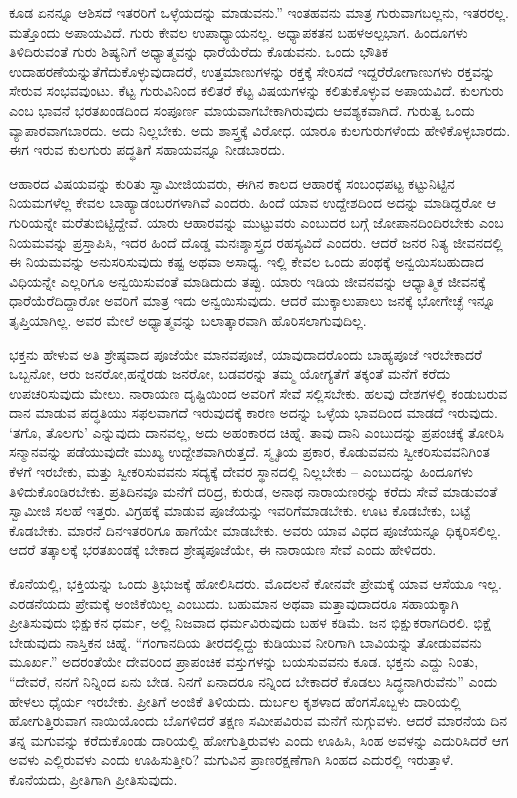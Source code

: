 ಕೂಡ ಏನನ್ನೂ ಆಶಿಸದೆ ಇತರರಿಗೆ ಒಳ್ಳೆಯದನ್ನು ಮಾಡುವನು.” ಇಂತಹವನು ಮಾತ್ರ ಗುರುವಾಗಬಲ್ಲನು, ಇತರರಲ್ಲ. ಮತ್ತೊಂದು ಅಪಾಯವಿದೆ. ಗುರು ಕೇವಲ ಉಪಾಧ್ಯಾಯನಲ್ಲ. ಅಧ್ಯಾಪಕತನ ಬಹಳ\break ಅಲ್ಪಭಾಗ. ಹಿಂದೂಗಳು ತಿಳಿದಿರುವಂತೆ ಗುರು ಶಿಷ್ಯನಿಗೆ ಅಧ್ಯಾತ್ಮ\break ವನ್ನು ಧಾರೆಯೆರೆದು ಕೊಡುವನು. ಒಂದು ಭೌತಿಕ ಉದಾಹರಣೆಯನ್ನು\break ತೆಗೆದುಕೊಳ್ಳುವುದಾದರೆ, ಉತ್ತಮಾಣುಗಳನ್ನು ರಕ್ತಕ್ಕೆ ಸೇರಿಸದೆ ಇದ್ದರೆ\break ರೋಗಾಣುಗಳು ರಕ್ತವನ್ನು ಸೇರುವ ಸಂಭವವುಂಟು. ಕೆಟ್ಟ ಗುರುವಿನಿಂದ ಕಲಿತರೆ ಕೆಟ್ಟ ವಿಷಯಗಳನ್ನು ಕಲಿತುಕೊಳ್ಳುವ ಅಪಾಯವಿದೆ. ಕುಲಗುರು ಎಂಬ ಭಾವನೆ ಭರತಖಂಡದಿಂದ ಸಂಪೂರ್ಣ ಮಾಯವಾಗಬೇಕಾಗಿರುವುದು ಆವಶ್ಯಕವಾಗಿದೆ. ಗುರುತ್ವ ಒಂದು ವ್ಯಾಪಾರವಾಗಬಾರದು. ಅದು ನಿಲ್ಲಬೇಕು. ಅದು ಶಾಸ್ತ್ರಕ್ಕೆ ವಿರೋಧ. ಯಾರೂ ಕುಲಗುರುಗಳೆಂದು ಹೇಳಿಕೊಳ್ಳಬಾರದು. ಈಗ ಇರುವ ಕುಲಗುರು ಪದ್ಧತಿಗೆ ಸಹಾಯವನ್ನೂ ನೀಡಬಾರದು.

ಆಹಾರದ ವಿಷಯವನ್ನು ಕುರಿತು ಸ್ವಾಮೀಜಿಯವರು, ಈಗಿನ ಕಾಲದ ಆಹಾರಕ್ಕೆ ಸಂಬಂಧಪಟ್ಟ ಕಟ್ಟುನಿಟ್ಟಿನ ನಿಯಮಗಳೆಲ್ಲ ಕೇವಲ ಬಾಹ್ಯಾಡಂಬರಗಳಾಗಿವೆ ಎಂದರು. ಹಿಂದೆ ಯಾವ ಉದ್ದೇಶದಿಂದ ಅದನ್ನು ಮಾಡಿದ್ದರೋ ಆ ಗುರಿಯನ್ನೇ ಮರೆತುಬಿಟ್ಟಿದ್ದೇವೆ. ಯಾರು ಆಹಾರವನ್ನು ಮುಟ್ಟುವರು ಎಂಬುದರ ಬಗ್ಗೆ ಜೋಪಾನದಿಂದಿರಬೇಕು ಎಂಬ ನಿಯಮವನ್ನು ಪ್ರಸ್ತಾಪಿಸಿ, ಇದರ ಹಿಂದೆ ದೊಡ್ಡ ಮನಃಶ್ಶಾಸ್ತ್ರದ ರಹಸ್ಯವಿದೆ ಎಂದರು. ಆದರೆ ಜನರ ನಿತ್ಯ ಜೀವನದಲ್ಲಿ ಈ ನಿಯಮವನ್ನು ಅನುಸರಿಸುವುದು ಕಷ್ಟ ಅಥವಾ ಅಸಾಧ್ಯ. ಇಲ್ಲಿ ಕೇವಲ ಒಂದು ಪಂಥಕ್ಕೆ ಅನ್ವಯಿಸಬಹುದಾದ ವಿಧಿಯನ್ನೇ ಎಲ್ಲರಿಗೂ ಅನ್ವಯಿಸುವಂತೆ ಮಾಡಿದುದು ತಪ್ಪು. ಯಾರು ಇಡಿಯ ಜೀವನವನ್ನು ಆಧ್ಯಾತ್ಮಿಕ ಜೀವನಕ್ಕೆ ಧಾರೆಯೆರೆದಿದ್ದಾರೋ ಅವರಿಗೆ ಮಾತ್ರ ಇದು ಅನ್ವಯಿಸುವುದು. ಆದರೆ ಮುಕ್ಕಾಲುಪಾಲು ಜನಕ್ಕೆ ಭೋಗೇಚ್ಛೆ ಇನ್ನೂ ತೃಪ್ತಿಯಾಗಿಲ್ಲ. ಅವರ ಮೇಲೆ ಅಧ್ಯಾತ್ಮವನ್ನು ಬಲಾತ್ಕಾರವಾಗಿ ಹೊರಿಸಲಾಗುವುದಿಲ್ಲ.

ಭಕ್ತನು ಹೇಳುವ ಅತಿ ಶ್ರೇಷ್ಠವಾದ ಪೂಜೆಯೇ ಮಾನವಪೂಜೆ, ಯಾವು\-ದಾದರೊಂದು ಬಾಹ್ಯಪೂಜೆ ಇರಬೇಕಾದರೆ ಒಬ್ಬನೋ, ಆರು ಜನರೋ,\break ಹನ್ನೆರಡು ಜನರೋ, ಬಡವರನ್ನು ತಮ್ಮ ಯೋಗ್ಯತೆಗೆ ತಕ್ಕಂತೆ ಮನೆಗೆ ಕರೆದು ಉಪಚರಿಸುವುದು ಮೇಲು. ನಾರಾಯಣ ದೃಷ್ಟಿಯಿಂದ ಅವರಿಗೆ ಸೇವೆ ಸಲ್ಲಿಸಬೇಕು. ಹಲವು ದೇಶಗಳಲ್ಲಿ ಕಂಡುಬರುವ ದಾನ ಮಾಡುವ ಪದ್ಧತಿಯು ಸಫಲವಾಗದೆ ಇರುವುದಕ್ಕೆ ಕಾರಣ ಅದನ್ನು ಒಳ್ಳೆಯ ಭಾವದಿಂದ ಮಾಡದೆ ಇರುವುದು. ‘ತಗೊ, ತೊಲಗು’ ಎನ್ನುವುದು ದಾನವಲ್ಲ, ಅದು ಅಹಂಕಾರದ ಚಿಹ್ನೆ. ತಾವು ದಾನಿ ಎಂಬುದನ್ನು ಪ್ರಪಂಚಕ್ಕೆ ತೋರಿಸಿ ಸನ್ಮಾನವನ್ನು ಪಡೆಯುವುದೇ ಮುಖ್ಯ ಉದ್ದೇಶವಾಗಿರುತ್ತದೆ. ಸ್ಮೃತಿಯ ಪ್ರಕಾರ, ಕೊಡುವವನು ಸ್ವೀಕರಿಸುವವನಿಗಿಂತ ಕೆಳಗೆ ಇರಬೇಕು, ಮತ್ತು ಸ್ವೀಕರಿಸುವವನು ಸದ್ಯಕ್ಕೆ ದೇವರ ಸ್ಥಾನದಲ್ಲಿ ನಿಲ್ಲಬೇಕು – ಎಂಬುದನ್ನು ಹಿಂದೂಗಳು ತಿಳಿದುಕೊಂಡಿರಬೇಕು. ಪ್ರತಿದಿನವೂ ಮನೆಗೆ ದರಿದ್ರ, ಕುರುಡ, ಅನಾಥ ನಾರಾಯಣರನ್ನು ಕರೆದು ಸೇವೆ ಮಾಡುವಂತೆ ಸ್ವಾಮೀಜಿ ಸಲಹೆ ಇತ್ತರು. ವಿಗ್ರಹಕ್ಕೆ ಮಾಡುವ ಪೂಜೆಯನ್ನು ಇವರಿಗೆ\break ಮಾಡಬೇಕು. ಊಟ ಕೊಡಬೇಕು, ಬಟ್ಟೆ ಕೊಡಬೇಕು. ಮಾರನೆ ದಿನ\break ಇತರರಿಗೂ ಹಾಗೆಯೇ ಮಾಡಬೇಕು. ಅವರು ಯಾವ ವಿಧದ ಪೂಜೆಯನ್ನೂ ಧಿಕ್ಕರಿಸಲಿಲ್ಲ. ಆದರೆ ತತ್ಕಾಲಕ್ಕೆ ಭರತಖಂಡಕ್ಕೆ ಬೇಕಾದ ಶ್ರೇಷ್ಠಪೂಜೆಯೇ, ಈ ನಾರಾಯಣ ಸೇವೆ ಎಂದು ಹೇಳಿದರು.

ಕೊನೆಯಲ್ಲಿ, ಭಕ್ತಿಯನ್ನು ಒಂದು ತ್ರಿಭುಜಕ್ಕೆ ಹೋಲಿಸಿದರು. ಮೊದಲನೆ ಕೋನವೇ ಪ್ರೇಮಕ್ಕೆ ಯಾವ ಆಸೆಯೂ ಇಲ್ಲ. ಎರಡನೆಯದು ಪ್ರೇಮಕ್ಕೆ ಅಂಜಿಕೆಯಿಲ್ಲ ಎಂಬುದು. ಬಹುಮಾನ ಅಥವಾ ಮತ್ತಾವುದಾದರೂ ಸಹಾಯಕ್ಕಾಗಿ ಪ್ರೀತಿಸುವುದು ಭಿಕ್ಷುಕನ ಧರ್ಮ, ಅಲ್ಲಿ ನಿಜವಾದ ಧರ್ಮವಿರುವುದು ಬಹಳ ಕಡಿಮೆ. ಜನ ಭಿಕ್ಷುಕರಾಗದಿರಲಿ. ಭಿಕ್ಷೆ ಬೇಡುವುದು ನಾಸ್ತಿಕನ ಚಿಹ್ನೆ. “ಗಂಗಾನದಿಯ ತೀರದಲ್ಲಿದ್ದು ಕುಡಿಯುವ ನೀರಿಗಾಗಿ ಬಾವಿಯನ್ನು ತೋಡುವವನು ಮೂರ್ಖ.” ಅದರಂತೆಯೇ ದೇವರಿಂದ ಪ್ರಾಪಂಚಿಕ ವಸ್ತುಗಳನ್ನು ಬಯಸುವವನು ಕೂಡ. ಭಕ್ತನು ಎದ್ದು ನಿಂತು, “ದೇವರೆ, ನನಗೆ ನಿನ್ನಿಂದ ಏನು ಬೇಡ. ನಿನಗೆ ಏನಾದರೂ ನನ್ನಿಂದ ಬೇಕಾದರೆ ಕೊಡಲು ಸಿದ್ಧನಾಗಿರುವೆನು” ಎಂದು ಹೇಳಲು ಧೈರ್ಯ ಇರಬೇಕು. ಪ್ರೀತಿಗೆ ಅಂಜಿಕೆ ತಿಳಿಯದು. ದುರ್ಬಲ ಕೃಶಳಾದ ಹೆಂಗಸೊಬ್ಬಳು ದಾರಿಯಲ್ಲಿ ಹೋಗುತ್ತಿರುವಾಗ ನಾಯಿಯೊಂದು ಬೊಗಳಿದರೆ ತಕ್ಷಣ ಸಮೀಪವಿರುವ ಮನೆಗೆ ನುಗ್ಗುವಳು. ಆದರೆ ಮಾರನೆಯ ದಿನ ತನ್ನ ಮಗುವನ್ನು ಕರೆದುಕೊಂಡು ದಾರಿಯಲ್ಲಿ ಹೋಗುತ್ತಿರುವಳು ಎಂದು ಊಹಿಸಿ, ಸಿಂಹ ಅವಳನ್ನು ಎದುರಿಸಿದರೆ ಆಗ ಅವಳು ಎಲ್ಲಿರುವಳು ಎಂದು ಊಹಿಸುತ್ತೀರಿ? ಮಗುವಿನ ಪ್ರಾಣರಕ್ಷಣೆಗಾಗಿ ಸಿಂಹದ ಎದುರಲ್ಲಿ ಇರುತ್ತಾಳೆ. ಕೊನೆಯದು, ಪ್ರೀತಿಗಾಗಿ ಪ್ರೀತಿಸುವುದು.


